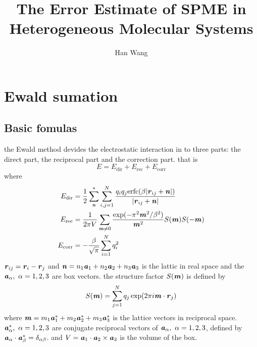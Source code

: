 \documentclass[aps,pre,preprint]{revtex4}
\renewcommand{\v}[1]{\textbf{\textit{#1}}}
\begin{document}
\title{The Error Estimate of SPME in Heterogeneous Molecular Systems}
\author{Han Wang}

\begin{abstract}
\end{abstract}



\section{Ewald sumation}
\subsection{Basic fomulas}
the Ewald method devides the electrostatic interaction in to three
parts: the direct part, the reciprocal part and the correction
part. that is
\begin{equation}
E = E_{\textrm{dir}} + E_{\textrm{rec}} + E_{\textrm{corr}}
\end{equation}
where 
\begin {align}
E_{\textrm{dir}} & = \frac12 \sum^{\ast}_{\v n}
\sum_{i,j = 1}^{N} \frac{q_iq_j \textrm{erfc}(\beta \vert\v{r}_{ij} + \v{n}\vert)}
{\vert\v{r}_{ij} + \v{n}\vert} \\
E_{\textrm{rec}} & = \frac1{2\pi V} \sum_{\v m \neq 0}
\frac{\exp(-\pi^2\v m^2 / \beta^2)}{\v m^2} S(\v m) S(-\v m) \\
 E_{\textrm{corr}}& = -\frac\beta{\sqrt \pi} \sum_{i=1}^N q_i^2
\end {align}
$\v r_{ij} = \v r_i - \v r_j$ and $\v n = n_1 \v a_1 + n_2 \v a_2 +
n_3 \v a_3$ is the lattic in real space and the $\v a_\alpha, \
\alpha=1,2,3$ are box vectors. the structure factor $S(\v m)$ is
defined by
\begin{equation}\label{sm1}
S(\v m) = \sum_{j=1}^N q_j \exp (2 \pi i \v m \cdot \v r_j)
\end{equation}
where $\v m = m_1 \v a_1^\ast + m_2 \v a_2^\ast + m_3 \v a_3^\ast$ is
the lattice vectors in reciprocal space. $\v a_\alpha^\ast,\ \alpha =
1, 2, 3$ are conjugate reciprocal vectors of $\v a_\alpha,\ \alpha =
1, 2, 3$, defined by $\v a_\alpha \cdot \v a_\beta^\ast =
\delta_{\alpha\beta}$. and $V = \v a_1 \cdot \v a_2 \times \v a_3$ is
the volume of the box.
\end{document}
